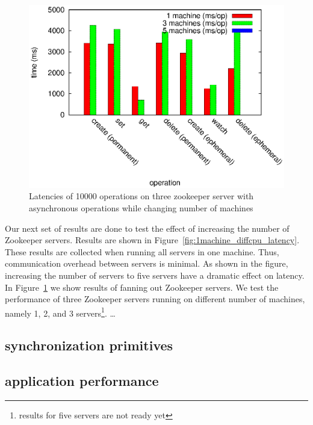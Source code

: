 \begin{figure}[h]
\centering
\includegraphics[scale=0.75]{img/1_machine_diff_machines.eps}
\caption{Latencies of 10000 operations on three zookeeper server with asynchronous operations while changing number of machines}
\label{fig:1machine_diffservers}
\end{figure}

Our next set of results are done to test the effect of increasing the number of Zookeeper servers. Results are shown in Figure~\ref{fig:1machine_diffcpu_latency}. These results are collected when running all servers in one machine. Thus, communication overhead between servers is minimal. As shown in the figure, increasing the number of servers to five servers have a dramatic effect on latency.
In Figure~\ref{fig:1machine_diffservers} we show results of fanning out Zookeeper servers. We test the performance of three Zookeeper servers running on different number of machines, namely 1, 2, and 3 servers\footnote{results for five servers are not ready yet}. \ldots

\subsection{synchronization primitives}

\subsection{application performance}

